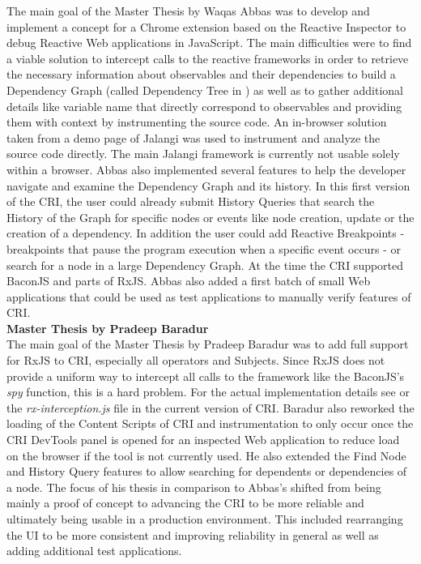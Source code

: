 	\cite{ThesisAbbas} The main goal of the Master Thesis by Waqas Abbas was to develop and implement a concept for a Chrome extension based on the Reactive Inspector to debug Reactive Web applications in JavaScript.
	The main difficulties were to find a viable solution to intercept calls to the reactive frameworks in order to retrieve the necessary information about observables and their dependencies to build a Dependency Graph (called Dependency Tree in \cite{ReactiveInspector}) as well as to gather additional details like variable name that directly correspond to observables and providing them with context by instrumenting the source code. An in-browser solution taken from a demo page \cite{JalangiDemo} of Jalangi was used to instrument and analyze the source code directly. The main Jalangi framework \cite{Jalangi} is currently not usable solely within a browser.
	Abbas also implemented several features to help the developer navigate and examine the Dependency Graph and its history. In this first version of the CRI, the user could already submit History Queries that search the History of the Graph for specific nodes or events like node creation, update or the creation of a dependency. In addition the user could add Reactive Breakpoints - breakpoints that pause the program execution when a specific event occurs - or search for a node in a large Dependency Graph.
	At the time the CRI supported BaconJS\cite{BaconJS} and parts of RxJS\cite{RxJS}. Abbas also added a first batch of small Web applications that could be used as test applications to manually verify features of CRI.\\		
		
	\textbf{Master Thesis by Pradeep Baradur}\\
	
	 \cite{ThesisBaradur} The main goal of the Master Thesis by Pradeep Baradur was to add full support for RxJS to CRI, especially all operators and Subjects. Since RxJS does not provide a uniform way to intercept all calls to the framework like the BaconJS's \emph{spy} function, this is a hard problem. For the actual implementation details see \cite{ThesisBaradur} or the \emph{rx-interception.js} file in the current version of CRI. Baradur also reworked the loading of the Content Scripts of CRI and instrumentation to only occur once the CRI DevTools panel is opened for an inspected Web application to reduce load on the browser if the tool is not currently used. He also extended the Find Node and History Query features to allow searching for dependents or dependencies of a node. The focus of his thesis in comparison to Abbas's shifted from being mainly a proof of concept to advancing the CRI to be more reliable and ultimately being usable in a production environment. This included rearranging the UI to be more consistent and improving reliability in general as well as adding additional test applications.\\		
		
